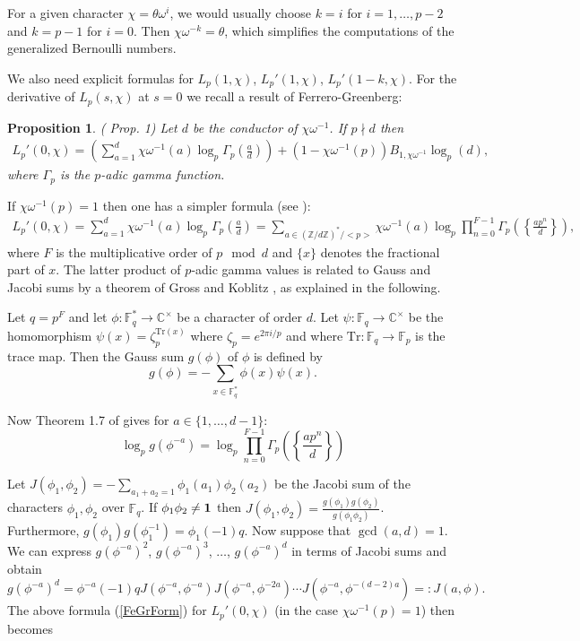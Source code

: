\documentclass[pdflatex,sn-mathphys-num]{sn-jnl}%
\theoremstyle{plain}
\newtheorem{prop}[thm]{Proposition}
\theoremstyle{definition}
\theoremstyle{remark}
\numberwithin{equation}{section}
\newcommand{\CC}{\mathbb{C}}
\newcommand{\ZZ}{\mathbb{Z}}
\newcommand{\Bf}{\mathbb{F}}
\begin{document}
For a given character $\chi = \theta\omega^{i}$, we would usually choose $k=i$ for $i=1,\dots,p-2$ and $k=p-1$ for $i=0$. Then $\chi \omega^{-k}=\theta$, which simplifies the computations of the generalized Bernoulli numbers.

We also need explicit formulas for $L_p(1,\chi)$, $L_p'(1,\chi)$, $L_p'(1-k,\chi)$. For the  derivative of $L_p(s,\chi)$ at $s=0$ we recall a result of Ferrero-Greenberg: 


\begin{prop} (\cite{FeGr} Prop. 1) Let $d$ be the conductor of $\chi \omega^{-1}$. If $p \nmid d$ then
\begin{align*} L_p'(0,\chi) = \left ( \sum_{a=1}^d \chi \omega^{-1} (a) \log_p \Gamma_p \left(\frac{a}{d}\right)  \right) + ( 1 - \chi \omega^{-1} (p) ) B_{1,\chi\omega^{-1}} \log_p (d) ,
\end{align*}
where $\Gamma_p$ is the $p$-adic gamma function. 
\label{FerrGreen}
\end{prop}

If  $\chi \omega^{-1}(p)=1$ then one has a simpler formula (see \cite{GrDa}):
\begin{align}   L_p'(0,\chi) = \sum_{a=1}^d \chi \omega^{-1} (a) \log_p \Gamma_p \left(\frac{a}{d}\right)  = 
  \sum_{a \in (\ZZ /d \ZZ)^*/<p> } \chi \omega^{-1} (a) \log_p \prod_{n=0}^{F-1}  \Gamma_p \left( \left\{ \frac{ap^n}{d} \right\} \right), 
  \label{FeGrForm}
  \end{align}
where $F$ is the multiplicative order of $p \mod d$ and $\{ x \}$ denotes the fractional part of $x$.
The latter product of $p$-adic gamma values  is related to Gauss and Jacobi sums by a theorem of Gross and Koblitz \cite{GrKo}, as explained in the following.

Let $q=p^F$ and let $\phi : \Bf_q^* \rightarrow \CC^{\times}$ be a character  of order $d$. Let $\psi: \Bf_q \rightarrow \CC^{\times}$ be the homomorphism
$\psi(x) = \zeta_p^{\text{Tr}(x)}$ where $\zeta_p = e^{2\pi i / p}$ and where $\text{Tr}: \Bf_q \rightarrow \Bf_p$ is the trace map. Then the Gauss sum $g(\phi)$ of $\phi$ is defined by
$$ g(\phi) = - \sum_{x \in \Bf_q^*} \phi(x) \psi(x). $$
 
  
 Now Theorem 1.7 of \cite{GrKo} gives for $a \in \{1, \dots, d-1 \}$:
 $$ \log_p g(\phi^{-a}) =  \log_p \prod_{n=0}^{F-1}  \Gamma_p \left( \left\{ \frac{ap^n}{d} \right\} \right) $$
 

 Let $J(\phi_1, \phi_2) = - \sum_{a_1+a_2=1} \phi_1(a_1) \phi_2(a_2)$ be 
 the Jacobi sum of the characters $\phi_1, \phi_2$ over $\Bf_q$.  If $\phi_1 \phi_2 \neq {\bf 1}$ then $J(\phi_1, \phi_2) = \frac{g(\phi_1) g(\phi_2)}{g(\phi_1 \phi_2)}$.
Furthermore, $g(\phi_1) g(\phi_1^{-1}) = \phi_1(-1) q$. Now suppose that $\gcd(a,d)=1$. We can express $g(\phi^{-a})^2$,  $g(\phi^{-a})^3$, $\dots$, $g(\phi^{-a})^d$  in terms of Jacobi sums and obtain
  $$  g(\phi^{-a})^d = \phi^{-a}(-1) q J(\phi^{-a}, \phi^{-a}) J(\phi^{-a}, \phi^{-2a}) \cdots J(\phi^{-a}, \phi^{-(d-2)a}) =: J(a, \phi) .$$
The above formula (\ref{FeGrForm}) for $L_p'(0,\chi)$ (in the case $\chi\omega^{-1}(p)=1$) then becomes
 
\end{document}

